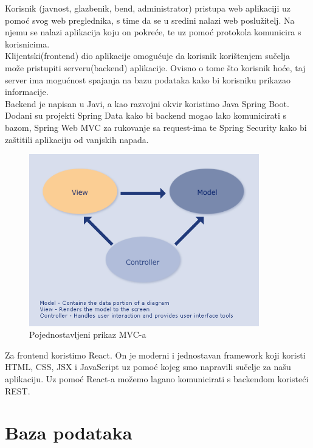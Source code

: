 	Korisnik (javnost, glazbenik, bend, administrator) pristupa web aplikaciji uz pomoć svog web preglednika, s time da se u sredini nalazi web poslužitelj. Na njemu se nalazi aplikacija koju on pokreće, te uz pomoć protokola komunicira s korisnicima.\\

	Klijentski(frontend) dio aplikacije omogućuje da korisnik korištenjem sučelja može pristupiti serveru(backend) aplikacije. Ovisno o tome što korisnik hoće, taj server ima mogućnost spajanja na bazu podataka kako bi korisniku prikazao informacije.\\

	Backend je napisan u Javi, a kao razvojni okvir koristimo Java Spring Boot. Dodani su projekti Spring Data kako bi backend mogao lako komunicirati s bazom, Spring Web MVC za rukovanje sa request-ima te Spring Security kako bi zaštitili aplikaciju od vanjskih napada. \\
	
	\begin{figure}[H]
		\begin{center}
			\includegraphics[width=10cm]{slike/mvc.PNG}
		\end{center}
		\caption{Pojednostavljeni prikaz MVC-a}
		\label{fig:mvc}
	\end{figure}

	Za frontend koristimo React. On je moderni i jednostavan framework koji koristi HTML, CSS, JSX i JavaScript uz pomoć kojeg smo napravili sučelje za našu aplikaciju. Uz pomoć React-a možemo lagano komunicirati s backendom koristeći REST.\\
	
				
		\section{Baza podataka}
			
